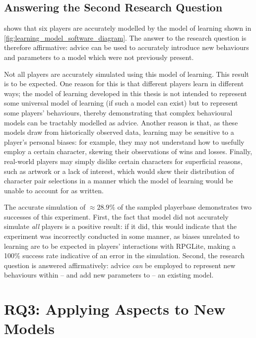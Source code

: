 \subsection{Answering the Second Research Question}

shows that six players are accurately modelled by the \aspectoriented model of
learning shown in \cref{fig:learning_model_software_diagram}. The answer to the
research question is therefore affirmative: advice can be used to accurately
introduce new behaviours and parameters to a model which were not previously
present.

Not all players are accurately simulated using this model of learning. This
result is to be expected. One reason for this is that different players learn in
different ways; the model of learning developed in this thesis is not intended
to represent some universal model of learning (if such a model can exist) but to
represent some players' behaviours, thereby demonstrating that complex
behavioural models can be tractably modelled as advice. Another reason is that,
as these models draw from historically observed data, learning may be sensitive
to a player's personal biases: for example, they may not understand how to
usefully employ a certain character, skewing their observations of wins and
losses. Finally, real-world players may simply dislike certain characters for
superficial reasons, such as artwork or a lack of interest, which would skew
their distribution of character pair selections in a manner which the model of
learning would be unable to account for as written.

The accurate simulation of $\approx{}28.9\%$ of the sampled playerbase demonstrates two
successes of this experiment. First, the fact that model did not accurately
simulate \emph{all} players is a positive result: if it did, this would indicate
that the experiment was incorrectly conducted in some manner, as biases
unrelated to learning are to be expected in players' interactions with RPGLite,
making a 100\% success rate indicative of an error in the simulation. Second,
the research question is answered affirmatively: advice \emph{can} be employed
to represent new behaviours within -- and add new parameters to -- an existing model. 



\section{RQ3: Applying Aspects to New Models}
\label{sec:rq4}



